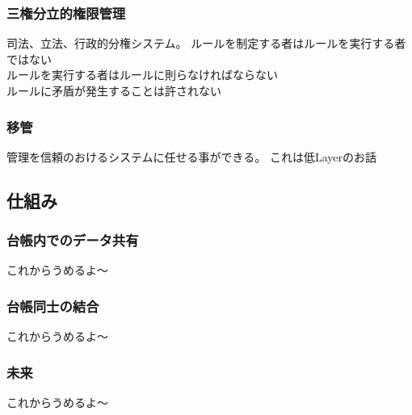 \documentclass[10pt,a4paper]{jarticle}
\begin{document}
\begin{multicols}{2}
\subsubsection{三権分立的権限管理}
司法、立法、行政的分権システム。
ルールを制定する者はルールを実行する者ではない\\
ルールを実行する者はルールに則らなければならない\\
ルールに矛盾が発生することは許されない\\

\subsubsection{移管}
管理を信頼のおけるシステムに任せる事ができる。
これは低Layerのお話

\subsection{仕組み}

\subsubsection{台帳内でのデータ共有}
これからうめるよ〜

\subsubsection{台帳同士の結合}
これからうめるよ〜

\subsubsection{未来}
これからうめるよ〜

\end{multicols}
\end{document}
